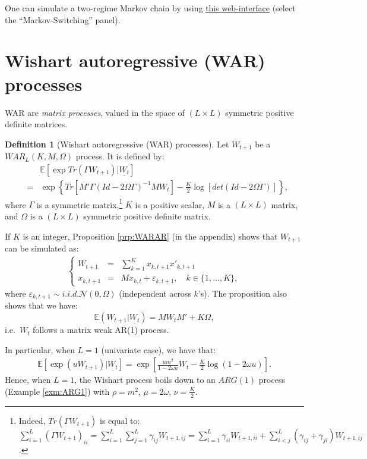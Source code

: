 \documentclass[
  12pt,
]{book}
\theoremstyle{definition}
\newtheorem{definition}{Definition}[chapter]
\theoremstyle{definition}
\theoremstyle{definition}
\theoremstyle{definition}
\theoremstyle{remark}
\begin{document}
One can simulate a two-regime Markov chain by using \href{https://jrenne.shinyapps.io/Affine/}{this web-interface} (select the ``Markov-Switching'' panel).

\hypertarget{WAR}{%
\section{Wishart autoregressive (WAR) processes}\label{WAR}}

WAR are \emph{matrix processes}, valued in the space of \((L \times L)\) symmetric positive
definite matrices.

\begin{definition}[Wishart autoregressive (WAR) processes]
\protect\hypertarget{def:WAR}{}\label{def:WAR}Let \(W_{t+1}\) be a \(WAR_L(K, M, \Omega)\) process. It is defined by:
\begin{eqnarray}
&&\mathbb{E}[\exp   Tr(\Gamma W_{t+1})|\underline{W_t}] \label{eq:Trace}\\
&=& \exp\left\{Tr[M'\Gamma(Id-2\Omega \Gamma)^{-1}M W_t]  -  \frac{K}{2}   \log [det(Id-2\Omega \Gamma)]\right\}, \nonumber
\end{eqnarray}
where \(\Gamma\) is a symmetric matrix,\footnote{Indeed, \(Tr(\Gamma W_{t+1})\) is equal to:
  \(\sum^L_{i=1}(\Gamma W_{t+1})_{ii} = \sum^L_{i=1} \sum^L_{j=1} \gamma_{ij} W_{t+1,ij} = \sum^L_{i=1} \gamma_{ii} W_{t+1,ii} + \sum^L_{i<j} (\gamma_{ij}+\gamma_{ji}) W_{t+1,ij}\).} \(K\) is a positive scalar, \(M\) is a \((L \times L)\) matrix, and \(\Omega\) is a \((L \times L)\) symmetric positive definite matrix.
\end{definition}

If \(K\) is an integer, Proposition \ref{prp:WARAR} (in the appendix) shows that \(W_{t+1}\) can be simulated as:
\begin{eqnarray*}
\left\{
\begin{array}{ccl}
W_{t+1} & =&  \sum^K_{k=1} x_{k,t+1} x'_{k,t+1}\\
x_{k,t+1} &=& M x_{k,t} + \varepsilon_{k,t+1},\quad k \in \{1,\dots,K\},
\end{array}
\right.
\end{eqnarray*}
where \(\varepsilon_{k,t+1} \sim i.i.d. \mathcal{N}(0, \Omega)\) (independent across \(k\)'s).
The proposition also shows that we have:
\[
\mathbb{E}(W_{t+1}|\underline{W_t}) = MW_tM'+K \Omega,
\]
i.e.~\(W_t\) follows a matrix weak AR(1) process.

In particular, when \(L=1\) (univariate case), we have that:
\begin{eqnarray*}
\mathbb{E}[\exp(u W_{t+1})|\underline{W_t}] = \exp\left[
\frac{u m^2}{1-2\omega u}W_t -
\frac{K}{2}   \log(1-2\omega u)\right].
\end{eqnarray*}
Hence, when \(L=1\), the Wishart process boils down to an \(ARG(1)\) process (Example \ref{exm:ARG1}) with \(\rho = m^2\), \(\mu = 2\omega\), \(\nu = \frac{K}{2}\).
\end{document}
